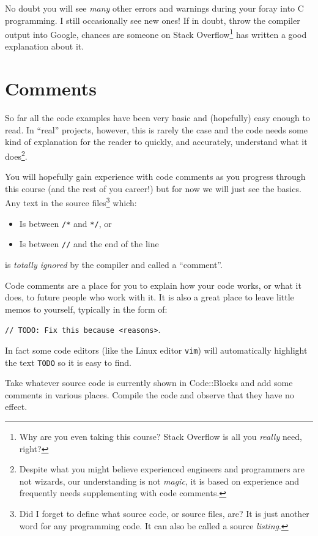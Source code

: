 \documentclass{lab}
\begin{document}
No doubt you will see \textit{many} other errors and warnings during your foray into C programming. I still occasionally see new ones! If in doubt, throw the compiler output into Google, chances are someone on Stack Overflow\footnote{Why are you even taking this course? Stack Overflow is all you \textit{really} need, right?} has written a good explanation about it.

\pagebreak
\section{Comments}

So far all the code examples have been very basic and (hopefully) easy enough to read. In ``real'' projects, however, this is rarely the case and the code needs some kind of explanation for the reader to quickly, and accurately, understand what it does\footnote{Despite what you might believe experienced engineers and programmers are not wizards, our understanding is not \textit{magic}, it is based on experience and frequently needs supplementing with code comments.}.

You will hopefully gain experience with code comments as you progress through this course (and the rest of you career!) but for now we will just see the basics. Any text in the source files\footnote{Did I forget to define what source code, or source files, are? It is just another word for any programming code. It can also be called a source \textit{listing}.} which:

\begin{itemize}
\item Is between \texttt{/*} and \texttt{*/}, or
\item Is between \texttt{//} and the end of the line
\end{itemize}

is \textit{totally ignored} by the compiler and called a ``comment''.

Code comments are a place for you to explain how your code works, or what it does, to future people who work with it. It is also a great place to leave little memos to yourself, typically in the form of:

\texttt{// TODO: Fix this because <reasons>}.

In fact some code editors (like the Linux editor \texttt{vim}) will automatically highlight the text \texttt{TODO} so it is easy to find.

\begin{task}{}{} Take whatever source code is currently shown in Code::Blocks and add some comments in various places. Compile the code and observe that they have no effect.
\end{task}
\end{document}
